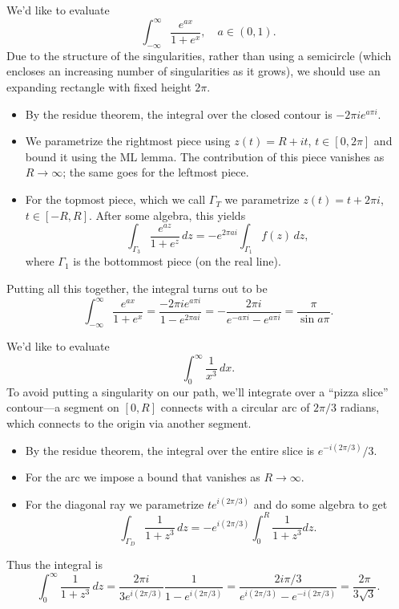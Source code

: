 \documentclass[../m136main.tex]{subfiles}
\begin{document}
\begin{example}[A rectangle]
    We'd like to evaluate
    \[ \int_{-\infty}^{\infty} \frac{e^{ax}}{1 + e^{x}}, \quad a \in (0,1). \]
    Due to the structure of the singularities, rather than using a semicircle (which encloses an increasing number of singularities as it grows), we should use an expanding rectangle with fixed height $2\pi$.
    \begin{itemize}[topsep=0pt]
        \item By the residue theorem, the integral over the closed contour is $-2\pi i e^{a\pi i}$.
        
        \item We parametrize the rightmost piece using $z(t) = R + it$, $t \in [0, 2\pi]$ and bound it using the ML lemma.
        The contribution of this piece vanishes as $R \to \infty$; the same goes for the leftmost piece.

        \item For the topmost piece, which we call $\Gamma_T$ we parametrize $z(t) = t + 2\pi i$, $t \in [-R, R]$.
        After some algebra, this yields
        \[ \int_{\Gamma_3} \frac{e^{az}}{1 + e^{z}} \,dz = -e^{2\pi a i} \int_{\Gamma_1} f(z) \,dz, \]
        where $\Gamma_1$ is the bottommost piece (on the real line).
    \end{itemize}
    Putting all this together, the integral turns out to be
    \[ \int_{-\infty}^{\infty} \frac{e^{ax}}{1 + e^{x}} = \frac{-2\pi i e^{a\pi i}}{1 - e^{2\pi a i}} = -\frac{2\pi i}{e^{-a\pi i} - e^{a\pi i}} = \frac{\pi}{\sin a\pi}. \]
\end{example}

\begin{example}
    We'd like to evaluate
    \[ \int_{0}^{\infty} \frac{1}{x^3} \,dx. \]
    To avoid putting a singularity on our path, we'll integrate over a ``pizza slice'' contour---a segment on $[0,R]$ connects with a circular arc of $2\pi / 3$ radians, which connects to the origin via another segment.
    \begin{itemize}[topsep=0pt]
        \item By the residue theorem, the integral over the entire slice is $e^{-i(2\pi / 3)} / 3$.
        
        \item For the arc we impose a bound that vanishes as $R \to \infty$.
        
        \item For the diagonal ray we parametrize $t e^{i(2\pi / 3)}$ and do some algebra to get
        \[ \int_{\Gamma_D} \frac{1}{1 + z^3} \,dz = -e^{i(2\pi / 3)} \int_{0}^{R} \frac{1}{1 + z^3} dz. \]
    \end{itemize}
    Thus the integral is
    \[ \int_{0}^{\infty}\frac{1}{1 + z^3} \,dz = \frac{2\pi i}{3e^{i(2\pi / 3)}} \frac{1}{1 - e^{i(2\pi / 3)}} = \frac{2i\pi / 3}{e^{i(2\pi / 3)} - e^{-i(2\pi / 3)}} = \frac{2\pi}{3 \sqrt{3}}. \]
\end{example}
\end{document}
